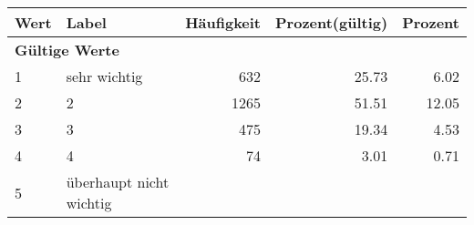     \begin{longtable}{lXrrr}
     \toprule
     \textbf{Wert} & \textbf{Label} & \textbf{Häufigkeit} & \textbf{Prozent(gültig)} & \textbf{Prozent} \\
     \endhead
     \midrule
     \multicolumn{5}{l}{\textbf{Gültige Werte}}\\

     1 &
     \multicolumn{1}{X}{ sehr wichtig   } &


       \num{632} &
       \num[round-mode=places,round-precision=2]{25,73} &
         \num[round-mode=places,round-precision=2]{6,02} \\

     2 &
     \multicolumn{1}{X}{ 2   } &


       \num{1265} &
       \num[round-mode=places,round-precision=2]{51,51} &
         \num[round-mode=places,round-precision=2]{12,05} \\

     3 &
     \multicolumn{1}{X}{ 3   } &


       \num{475} &
       \num[round-mode=places,round-precision=2]{19,34} &
         \num[round-mode=places,round-precision=2]{4,53} \\

     4 &
     \multicolumn{1}{X}{ 4   } &


       \num{74} &
       \num[round-mode=places,round-precision=2]{3,01} &
         \num[round-mode=places,round-precision=2]{0,71} \\

     5 &
     \multicolumn{1}{X}{ überhaupt nicht wichtig   } &



\end{longtable}
